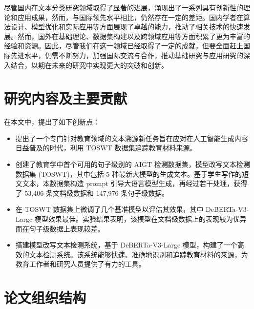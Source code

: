 尽管国内在文本分类研究领域取得了显著的进展，涌现出了一系列具有创新性的理论和应用成果，然而，与国际领先水平相比，仍然存在一定的差距。国内学者在算法设计、模型优化和实际应用等方面展现了卓越的能力，推动了相关技术的快速发展。然而，国外在基础理论、数据集构建以及跨领域应用等方面积累了更为丰富的经验和资源。因此，尽管我们在这一领域已经取得了一定的成就，但要全面赶上国际先进水平，仍需不断努力，加强国际交流与合作，推动基础研究与应用研究的深入结合，以期在未来的研究中实现更大的突破和创新。

\section{研究内容及主要贡献}
\label{sec:intro-contribution}

在本文中，提出了如下创新点：

\begin{itemize}
    \item 提出了一个专门针对教育领域的文本溯源新任务旨在应对在人工智能生成内容日益普及的时代，利用 TOSWT 数据集追踪教育材料来源。

    \item 创建了教育学中首个可用的句子级别的 AIGT 检测数据集，模型改写文本检测数据集 (TOSWT)，其中包括 5 种最新大模型的生成文本。基于学生写作的短文文本，本数据集构造 prompt 引导大语言模型生成，再经过若干处理，获得了 53,406 条文档级数据和 147,976 条句子级数据。

    \item 在 TOSWT 数据集上微调了几个基准模型以评估其效果，其中 DeBERTa-V3-Large 模型效果最佳。实验结果表明，该模型在文档级数据上的表现较为优异而在句子级数据上表现较差。

    \item 搭建模型改写文本检测系统，基于 DeBERTa-V3-Large 模型，构建了一个高效的文本检测系统。该系统能够快速、准确地识别和追踪教育材料的来源，为教育工作者和研究人员提供了有力的工具。
\end{itemize}

\section{论文组织结构}
\label{sec:intro-paperarchitect}

